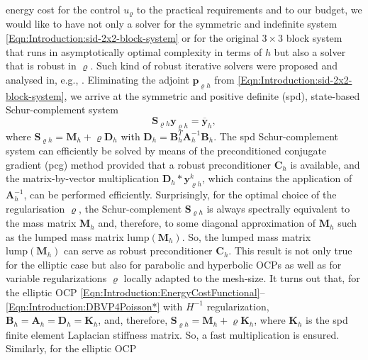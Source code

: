 \documentclass{article}
\numberwithin{equation}{section}
\begin{document}
energy cost for the control $u_\varrho$ to the practical requirements and
to our budget, we would like to have not only a solver for the symmetric
and indefinite system  \eqref{Eqn:Introduction:sid-2x2-block-system} 
or for the original $3 \times 3$ block system that runs in asymptotically
optimal complexity in terms of $h$ but also a solver that is robust in
$\varrho$. Such kind of robust iterative solvers were proposed and analysed in,
e.g.,
\cite{SchoeberlSimonZulehner2011SINUM,SchulzWittum2008CVS,Zulehner:2011SIMAX}.
Eliminating the adjoint $\mathbf{p}_{\varrho h}$ from
\eqref{Eqn:Introduction:sid-2x2-block-system}, we arrive at the symmetric
and positive definite (spd), state-based Schur-complement system 
\begin{equation}\label{Eqn:Introduction:Sy=rhs}
 \mathbf{S}_{\varrho h} \mathbf{y}_{\varrho h} = \mathbf{\overline{y}}_h,
\end{equation}
where $\mathbf{S}_{\varrho h} = \mathbf{M}_h + \varrho \mathbf{D}_h$ with
$\mathbf{D}_h = \mathbf{B}_h^T\mathbf{A}_h^{-1}\mathbf{B}_h$.
The spd Schur-complement system can efficiently be solved by means of
the preconditioned conjugate gradient (pcg) method 
provided that a robust preconditioner $\mathbf{C}_h$ is available, and 
the matrix-by-vector multiplication 
$\mathbf{D}_h * \mathbf{y}_{\varrho h}^k$,  which contains the application of
$\mathbf{A}_h^{-1}$, can be performed efficiently.
Surprisingly, for the optimal choice of the regularisation $\varrho$, the 
Schur-complement $\mathbf{S}_{\varrho h}$ is always spectrally equivalent 
to the mass matrix $\mathbf{M}_h$ and, therefore, to some diagonal 
approximation of $\mathbf{M}_h$ such as the lumped mass matrix
$\mbox{lump}(\mathbf{M}_h)$. So, the lumped mass matrix
$\mbox{lump}(\mathbf{M}_h)$ can serve as robust preconditioner
$\mathbf{C}_h$. This result is not only true for the elliptic case
\cite{LangerLoescherSteinbachYang:2023CMAM,LangerLoescherSteinbachYang:2024NLA}
but also for parabolic \cite{LangerSteinbachYang:2024ACOM} 
and hyperbolic \cite{LoescherSteinbach:2022SINUM} OCPs as well as for 
variable regularizations $\varrho$ locally adapted to the mesh-size.
It turns out that, for the elliptic OCP
\eqref{Eqn:Introduction:EnergyCostFunctional}--\eqref{Eqn:Introduction:DBVP4Poisson*} with $H^{-1}$ regularization,
$\mathbf{B}_h = \mathbf{A}_h = \mathbf{D}_h = \mathbf{K}_h$, and, therefore, 
$\mathbf{S}_{\varrho h} = \mathbf{M}_h + \varrho \mathbf{K}_h$,
where $\mathbf{K}_h$ is the spd finite element Laplacian stiffness matrix.
So, a fast multiplication is ensured. Similarly, for the elliptic OCP
\end{document}
